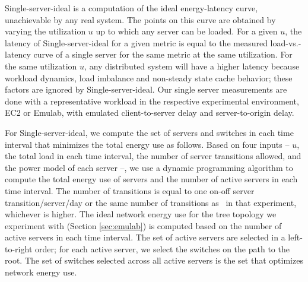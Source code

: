 Single-server-ideal is a computation of the ideal energy-latency curve, unachievable by any real system. The points on this curve are obtained by varying the utilization $u$ up to which any server can be loaded. For a given $u$, the latency of Single-server-ideal for a given metric is equal to the measured load-vs.-latency curve of a single server for the same metric at the same utilization. For the same utilization $u$, any distributed system will have a higher latency because workload dynamics, load imbalance and non-steady state cache behavior; these factors are ignored by Single-server-ideal. Our single server measurements are done with a representative workload in the respective experimental environment, EC2 or Emulab, with emulated client-to-server delay and server-to-origin delay. 


For Single-server-ideal, we compute the set of servers and switches in each time interval that minimizes the total energy use as follows. Based on four inputs -- $u$, the total load in each time interval, the number of server transitions allowed, and the power model of each server --, we use a dynamic programming algorithm to compute the total energy use of servers and the number of active servers in each time interval. The number of transitions is equal to one on-off server transition/server/day or the same number of transitions as \shrink\ in that experiment, whichever is higher. The ideal network energy use for the tree topology we experiment with (Section \ref{sec:emulab}) is computed based on the number of active servers in each time interval. The set of active servers are selected in a left-to-right order; for each active server, we select the switches on the path to the root. The set of switches selected across all active servers is the set that optimizes network energy use.

